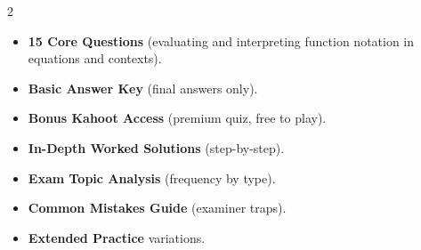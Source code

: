 \documentclass[11pt,a4paper]{article}
\newcommand{\FullReleaseDate}{April 30, 2026}
\begin{document}
\vspace{8pt}

\begin{multicols}{2}
  \begin{tcolorbox}[card, title=\sffamily\bfseries\textcolor{white}{\faHandPointDown\ TODAY (Simplified Version)}, colbacktitle=mainblue, boxed title style={sharp corners, boxrule=0pt}]
    \begin{itemize}[leftmargin=1.2em, itemsep=2pt]
      \item \small \textbf{15 Core Questions} (evaluating and interpreting function notation in equations and contexts).
      \item \small \textbf{Basic Answer Key} (final answers only).
      \item \small \textbf{Bonus Kahoot Access} (premium quiz, free to play).
    \end{itemize}
  \end{tcolorbox}

  \columnbreak

  \begin{tcolorbox}[card, title=\sffamily\bfseries\textcolor{white}{\faRocket\ ON \FullReleaseDate\ (Full Upgrade)}, colbacktitle=mainblue, boxed title style={sharp corners, boxrule=0pt}]
    \begin{itemize}[leftmargin=1.2em, itemsep=2pt]
      \item \small \textbf{In-Depth Worked Solutions} (step-by-step).
      \item \small \textbf{Exam Topic Analysis} (frequency by type).
      \item \small \textbf{Common Mistakes Guide} (examiner traps).
      \item \small \textbf{Extended Practice} variations.
    \end{itemize}
  \end{tcolorbox}
\end{multicols}
\end{document}
